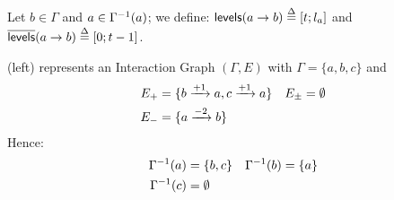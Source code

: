 \begin{definition}\label{def:levels}
Let $b \in \Gamma$ and $a \in \Gamma^{-1}(a)$;
we define: $\mathsf{levels}(a\rightarrow b) \stackrel{\Delta}= [t; l_a]$ and $\overline{\mathsf{levels}}(a\rightarrow b) \stackrel{\Delta}= [0; t-1]$.
\end{definition}

\begin{example*}
(left) represents an Interaction Graph $(\Gamma,E)$ with
$\Gamma = \{a, b, c\}$ and
\begin{align*}
  E_+ &= \{b \xrightarrow{+ 1} a, c \xrightarrow{+ 1} a\} &
  E_\pm &= \emptyset \\
  E_- &= \{a \xrightarrow{- 2} b\}
\end{align*}
Hence:
\begin{align*}
  \Gamma^{-1}(a) &= \{ b, c \} &
  \Gamma^{-1}(b) &= \{ a \} \\
  \Gamma^{-1}(c) &= \emptyset
\end{align*}
\end{example*}

